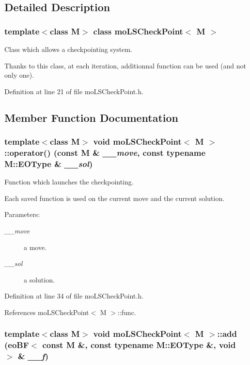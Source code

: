 \subsection{Detailed Description}
\subsubsection*{template$<$class M$>$ class moLSCheckPoint$<$ M $>$}

Class which allows a checkpointing system. 

Thanks to this class, at each iteration, additionnal function can be used (and not only one). 



Definition at line 21 of file moLSCheckPoint.h.

\subsection{Member Function Documentation}
\subsubsection{\setlength{\rightskip}{0pt plus 5cm}template$<$class M$>$ void {\bf moLSCheckPoint}$<$ M $>$::operator() (const M \& {\em \_\-\_\-move}, const typename M::EOType \& {\em \_\-\_\-sol})\hspace{0.3cm}{\tt  [inline]}}\label{classmo_l_s_check_point_2f9c1250279e3f49ec77a66c10029f1e}


Function which launches the checkpointing. 

Each saved function is used on the current move and the current solution.

\begin{Desc}
\item[Parameters:]
\begin{description}
\item[{\em \_\-\_\-move}]a move. \item[{\em \_\-\_\-sol}]a solution. \end{description}
\end{Desc}


Definition at line 34 of file moLSCheckPoint.h.

References moLSCheckPoint$<$ M $>$::func.
\subsubsection{\setlength{\rightskip}{0pt plus 5cm}template$<$class M$>$ void {\bf moLSCheckPoint}$<$ M $>$::add ({\bf eoBF}$<$ const M \&, const typename M::EOType \&, void $>$ \& {\em \_\-\_\-f})\hspace{0.3cm}{\tt  [inline]}}\label{classmo_l_s_check_point_66be5fe2944bcdd752f1e58105e969a6}


